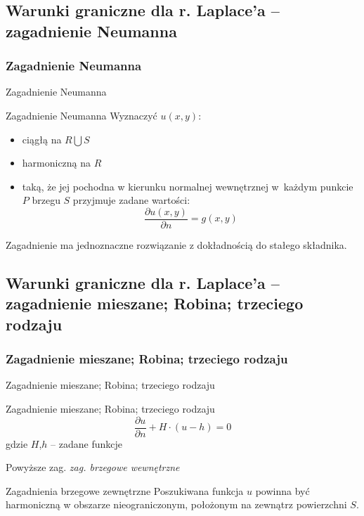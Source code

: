 \subsection*{Warunki graniczne dla r. Laplace'a -- zagadnienie Neumanna}
\subsubsection{Zagadnienie Neumanna}

\begin{frame}{Zagadnienie Neumanna}
  \begin{block}{Zagadnienie Neumanna}
    Wyznaczyć $u(x,y)$:
    \begin{itemize}
      \item ciągłą na $R \bigcup S$
      \item harmoniczną na $R$
      \item taką, że jej pochodna w kierunku normalnej wewnętrznej w~każdym punkcie $P$ brzegu $S$ przyjmuje zadane wartości:
      $$\frac{{\partial}u(x,y)}{{\partial}n} = g(x,y)$$
    \end{itemize}
  \end{block}
  Zagadnienie ma jednoznaczne rozwiązanie z dokładnością do stałego składnika.
\end{frame}

\subsection*{Warunki graniczne dla r. Laplace'a -- zagadnienie mieszane; Robina; trzeciego rodzaju}
\subsubsection{Zagadnienie mieszane; Robina; trzeciego rodzaju}

\begin{frame}{Zagadnienie mieszane; Robina; trzeciego rodzaju}
  \begin{block}{Zagadnienie mieszane; Robina; trzeciego rodzaju}
    $$\frac{{\partial}u}{{\partial}n} + H \cdot (u - h) = 0$$
    gdzie $H$,$h$ -- zadane funkcje
  \end{block}
  Powyższe zag. \textit{zag. brzegowe wewnętrzne} %
\end{frame}

\begin{frame}
  \begin{block}{Zagadnienia brzegowe zewnętrzne}
    Poszukiwana funkcja $u$ powinna być harmoniczną w obszarze nieograniczonym, położonym na zewnątrz powierzchni $S$.
  \end{block}
\end{frame}

